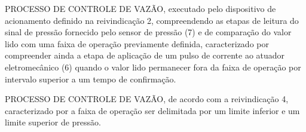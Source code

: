 \begin{quadroreivindicatorio}
\reivindicacao PROCESSO DE CONTROLE DE VAZÃO, executado pelo dispositivo de
acionamento definido na reivindicação 2, compreendendo as etapas de leitura do
sinal de pressão fornecido pelo sensor de pressão (7) e de comparação do valor
lido com uma faixa de operação previamente definida, caracterizado por
compreender ainda a etapa de aplicação de um pulso de corrente ao atuador
eletromecânico (6) quando o valor lido permanecer fora da faixa de operação por
intervalo superior a um tempo de confirmação.

\reivindicacao PROCESSO DE CONTROLE DE VAZÃO, de acordo com a reivindicação 4,
caracterizado por a faixa de operação ser delimitada por um limite inferior e
um limite superior de pressão.


\else



\end{quadroreivindicatorio}
